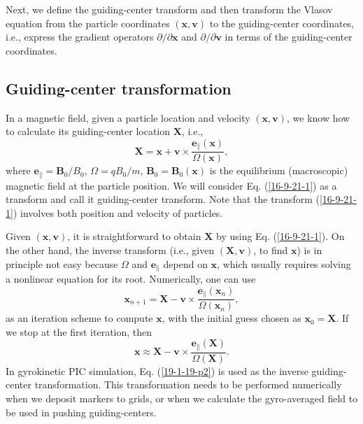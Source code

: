 \documentclass{llncs}
\newcommand{\tmmathbf}[1]{\ensuremath{\boldsymbol{#1}}}
\begin{document}
Next, we define the guiding-center transform and then transform the Vlasov
equation from the particle coordinates $(\mathbf{x}, \mathbf{v})$ to the
guiding-center coordinates, i.e., express the gradient operators $\partial /
\partial \mathbf{x}$ and $\partial / \partial \mathbf{v}$ in terms of the
guiding-center coordinates.

\subsection{Guiding-center transformation}

In a magnetic field, given a particle location and velocity $(\mathbf{x},
\mathbf{v})$, we know how to calculate its guiding-center location
$\mathbf{X}$, i.e.,
\begin{equation}
  \label{16-9-21-1} \mathbf{X}=\mathbf{x}+\mathbf{v} \times
  \frac{\tmmathbf{e}_{\parallel} (\mathbf{x})}{\Omega (\mathbf{x})},
\end{equation}
where $\tmmathbf{e}_{\parallel} =\mathbf{B}_0 / B_0$, $\Omega = q B_0 / m$,
$\mathbf{B}_0 =\mathbf{B}_0 (\mathbf{x})$ is the equilibrium (macroscopic)
magnetic field at the particle position. We will consider Eq.
(\ref{16-9-21-1}) as a transform and call it guiding-center
transform{\cite{Catto1978}}. Note that the transform (\ref{16-9-21-1})
involves both position and velocity of particles.

Given $(\mathbf{x}, \mathbf{v})$, it is straightforward to obtain $\mathbf{X}$
by using Eq. (\ref{16-9-21-1}). On the other hand, the inverse transform
(i.e., given $(\mathbf{X}, \mathbf{v})$, to find $\mathbf{x}$) is in principle
not easy because $\Omega$ and $\mathbf{e}_{\parallel}$ depend on $\mathbf{x}$,
which usually requires solving a nonlinear equation for its root. Numerically,
one can use
\begin{equation}
  \label{18-9-13-p1} \mathbf{x}_{n + 1} =\mathbf{X}-\mathbf{v} \times
  \frac{\tmmathbf{e}_{\parallel} (\mathbf{x}_n)}{\Omega (\mathbf{x}_n)},
\end{equation}
as an iteration scheme to compute $\mathbf{x}$, with the initial guess chosen
as $\mathbf{x}_0 =\mathbf{X}$. If we stop at the first iteration, then
\begin{equation}
  \label{19-1-19-p2} \mathbf{x} \approx \mathbf{X}-\mathbf{v} \times
  \frac{\tmmathbf{e}_{\parallel} (\mathbf{X})}{\Omega (\mathbf{X})} .
\end{equation}
In gyrokinetic PIC simulation, Eq. (\ref{19-1-19-p2}) is used as the inverse
guiding-center transformation. This transformation needs to be performed
numerically when we deposit markers to grids, or when we calculate the
gyro-averaged field to be used in pushing guiding-centers.
\end{document}
